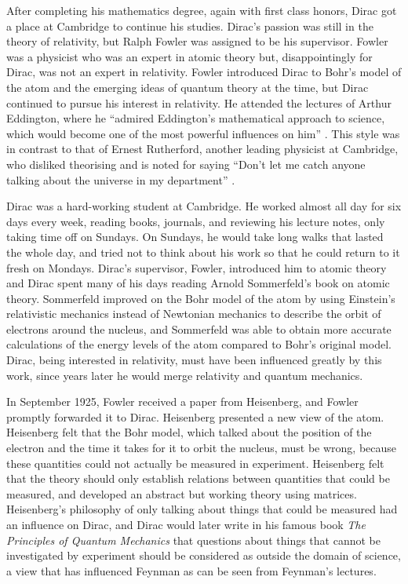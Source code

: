 \documentclass[12pt, oneside, letterpaper, fleqn]{article}
\begin{document}
After completing his mathematics degree, again with first class honors,
Dirac got a place at Cambridge to continue his studies. Dirac's passion
was still in the theory of relativity, but Ralph Fowler was assigned to
be his supervisor. Fowler was a physicist who was an expert in atomic
theory but, disappointingly for Dirac, was not an expert in relativity.
Fowler introduced Dirac to Bohr's model of the atom and the emerging
ideas of quantum theory at the time, but Dirac continued to pursue his
interest in relativity. He attended the lectures of Arthur Eddington,
where he ``admired Eddington's mathematical approach to science, which
would become one of the most powerful influences on him'' \cite[pg.
61]{strangest_man}. This style was in contrast to that of Ernest
Rutherford, another leading physicist at Cambridge, who disliked
theorising and is noted for saying ``Don't let me catch anyone talking
about the universe in my department'' \cite[pg. 61]{strangest_man}.

Dirac was a hard-working student at Cambridge. He worked almost all day
for six days every week, reading books, journals, and reviewing his
lecture notes, only taking time off on Sundays. On Sundays, he would
take long walks that lasted the whole day, and tried not to think about
his work so that he could return to it fresh on Mondays. Dirac's
supervisor, Fowler, introduced him to atomic theory and Dirac spent many
of his days reading Arnold Sommerfeld's book on atomic theory.
Sommerfeld improved on the Bohr model of the atom by using Einstein's
relativistic mechanics instead of Newtonian mechanics to describe the
orbit of electrons around the nucleus, and Sommerfeld was able to obtain
more accurate calculations of the energy levels of the atom compared to
Bohr's original model. Dirac, being interested in relativity, must have
been influenced greatly by this work, since years later he would
merge relativity and quantum mechanics.

In September 1925, Fowler received a paper from Heisenberg, and Fowler
promptly forwarded it to Dirac. Heisenberg presented a new view of the
atom. Heisenberg felt that the Bohr model, which talked about the
position of the electron and the time it takes for it to orbit the
nucleus, must be wrong, because these quantities could not actually be
measured in experiment. Heisenberg felt that the theory should only
establish relations between quantities that could be measured, and
developed an abstract but working theory using matrices. Heisenberg's
philosophy of only talking about things that could be measured had an
influence on Dirac, and Dirac would later write in his famous book
\textit{The Principles of Quantum Mechanics} \cite{principles} that
questions about things that cannot be investigated by experiment should
be considered as outside the domain of science, a view that has
influenced Feynman as can be seen from Feynman's lectures.
\end{document}
